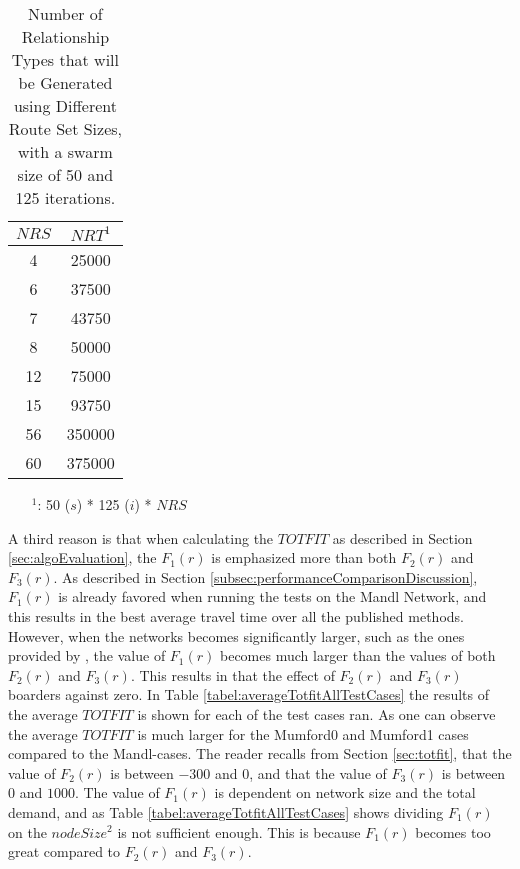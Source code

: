 \begin{table}[H]
    \centering
    \hspace*{-1.0cm}
    \begin{tabular}{|c|c|}
        \hline
        \textbf{$NRS$} & \textbf{$NRT^1$}\\
        \hline
        4 & 25000\\
        \hline
        6 & 37500\\
        \hline
        7 & 43750\\
        \hline
        8 & 50000\\
        \hline
        12 & 75000\\
        \hline
        15 & 93750\\
        \hline
        56 & 350000\\
        \hline
        60 & 375000\\
        \hline
    \end{tabular}
    \caption{Number of Relationship Types that will be Generated using Different Route Set Sizes, with a swarm size of 50 and 125 iterations.}
    \begin{itemize}[noitemsep]
    \item[$^1$:] 50 ($s$) * 125 ($i$) * $NRS$
    \end{itemize} 
    \label{tabel:numberOfRelationshipTypes}
\end{table} 

A third reason is that when calculating the $TOTFIT$ as described in Section \vref{sec:algoEvaluation}, the $F_1(r)$ is emphasized more than both $F_2(r)$ and $F_3(r)$. As described in Section \vref{subsec:performanceComparisonDiscussion}, $F_1(r)$ is already favored when running the tests on the Mandl Network, and this results in the best average travel time over all the published methods. However, when the networks becomes significantly larger, such as the ones provided by \citet{mumford13}, the value of $F_1(r)$ becomes much larger than the values of both $F_2(r)$ and $F_3(r)$. This results in that the effect of $F_2(r)$ and $F_3(r)$ boarders against zero. In Table \ref{tabel:averageTotfitAllTestCases} the results of the average $TOTFIT$ is shown for each of the test cases ran. As one can observe the average $TOTFIT$ is much larger for the Mumford0 and Mumford1 cases compared to the Mandl-cases. The reader recalls from Section \vref{sec:totfit}, that the value of $F_2(r)$ is between $-300$ and $0$, and that the value of $F_3(r)$ is between $0$ and $1000$. The value of $F_1(r)$ is dependent on network size and the total demand, and as Table \vref{tabel:averageTotfitAllTestCases} shows dividing $F_1(r)$ on the $nodeSize^2$ is not sufficient enough. This is because $F_1(r)$ becomes too great compared to $F_2(r)$ and $F_3(r)$. 

